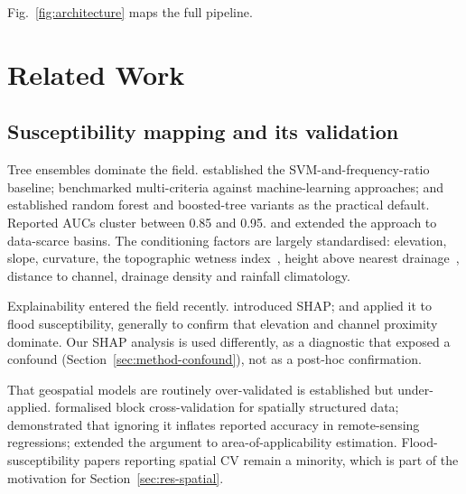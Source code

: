 \documentclass[10pt,twocolumn]{article}
\begin{document}
Fig.~\ref{fig:architecture} maps the full pipeline.

\section{Related Work}
\label{sec:related}

\subsection{Susceptibility mapping and its validation}
Tree ensembles dominate the field. \citet{tehrany2014} established the
SVM-and-frequency-ratio baseline; \citet{khosravi2018} benchmarked multi-criteria
against machine-learning approaches; \citet{arabameri2019} and \citet{saha2021}
established random forest and boosted-tree variants as the practical default.
Reported AUCs cluster between 0.85 and 0.95. \citet{wang2020} and
\citet{avand2021} extended the approach to data-scarce basins.
The conditioning factors are largely standardised: elevation, slope, curvature,
the topographic wetness index~\citep{beven1979}, height above nearest
drainage~\citep{renno2008,nobre2011}, distance to channel, drainage density and
rainfall climatology.

Explainability entered the field recently. \citet{lundberg2017} introduced SHAP;
\citet{aydin2022} and \citet{seydi2023} applied it to flood susceptibility,
generally to confirm that elevation and channel proximity dominate. Our SHAP
analysis is used differently, as a diagnostic that exposed a confound
(Section~\ref{sec:method-confound}), not as a post-hoc confirmation.

That geospatial models are routinely over-validated is established but
under-applied. \citet{roberts2017} formalised block cross-validation for
spatially structured data; \citet{ploton2020} demonstrated that ignoring it
inflates reported accuracy in remote-sensing regressions; \citet{meyer2021}
extended the argument to area-of-applicability estimation. Flood-susceptibility
papers reporting spatial CV remain a minority, which is part of the motivation
for Section~\ref{sec:res-spatial}.
\end{document}
